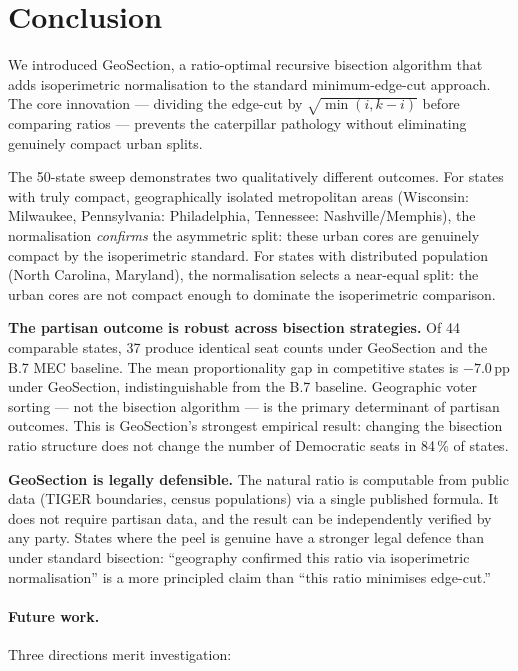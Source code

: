 \section{Conclusion}
\label{sec:conclusion}

We introduced GeoSection, a ratio-optimal recursive bisection algorithm that
adds isoperimetric normalisation to the standard minimum-edge-cut approach.
The core innovation --- dividing the edge-cut by $\sqrt{\min(i,k-i)}$ before
comparing ratios --- prevents the caterpillar pathology without eliminating
genuinely compact urban splits.

The 50-state sweep demonstrates two qualitatively different outcomes.
For states with truly compact, geographically isolated metropolitan areas
(Wisconsin: Milwaukee, Pennsylvania: Philadelphia, Tennessee: Nashville/Memphis),
the normalisation \emph{confirms} the asymmetric split: these urban cores
are genuinely compact by the isoperimetric standard.
For states with distributed population (North Carolina, Maryland), the
normalisation selects a near-equal split: the urban cores are not compact
enough to dominate the isoperimetric comparison.

\textbf{The partisan outcome is robust across bisection strategies.}
Of 44 comparable states, 37 produce identical seat counts under GeoSection
and the B.7 MEC baseline.
The mean proportionality gap in competitive states is $-7.0$\,pp under
GeoSection, indistinguishable from the B.7 baseline.
Geographic voter sorting --- not the bisection algorithm --- is the primary
determinant of partisan outcomes.
This is GeoSection's strongest empirical result: changing the bisection
ratio structure does not change the number of Democratic seats in 84\,\%
of states.

\textbf{GeoSection is legally defensible.}
The natural ratio is computable from public data (TIGER boundaries, census
populations) via a single published formula.
It does not require partisan data, and the result can be independently
verified by any party.
States where the peel is genuine have a stronger legal defence than under
standard bisection: ``geography confirmed this ratio via isoperimetric
normalisation'' is a more principled claim than ``this ratio minimises
edge-cut.''

\paragraph{Future work.}
Three directions merit investigation:

